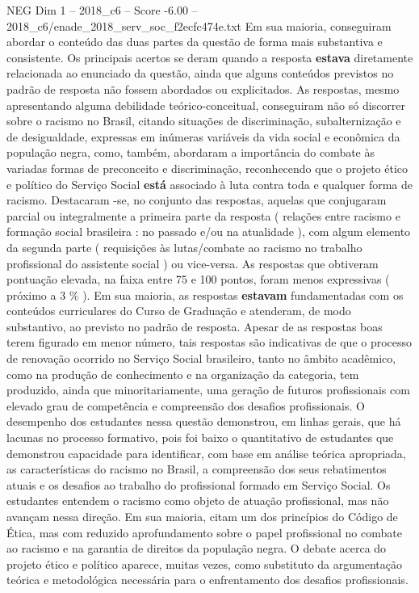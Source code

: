 \begin{textsample}{NEG Dim 1 – 2018\_c6 – Score -6.00 – 2018\_c6/enade\_2018\_serv\_soc\_f2ecfc474e.txt}
Em sua maioria, conseguiram abordar o conteúdo das duas partes da questão de forma mais substantiva e consistente.
Os principais acertos se deram quando a resposta \textbf{estava} diretamente relacionada ao enunciado da questão, ainda que alguns conteúdos previstos no padrão de resposta não fossem abordados ou explicitados.
As respostas, mesmo apresentando alguma debilidade teórico-conceitual, conseguiram não só discorrer sobre o racismo no Brasil, citando situações de discriminação, subalternização e de desigualdade, expressas em inúmeras variáveis da vida social e econômica da população negra, como, também, abordaram a importância do combate às variadas formas de preconceito e discriminação, reconhecendo que o projeto ético e político do Serviço Social \textbf{está} associado à luta contra toda e qualquer forma de racismo.
Destacaram -se, no conjunto das respostas, aquelas que conjugaram parcial ou integralmente a primeira parte da resposta ( relações entre racismo e formação social brasileira : no passado e/ou na atualidade ), com algum elemento da segunda parte ( requisições às lutas/combate ao racismo no trabalho profissional do assistente social ) ou vice-versa.
As respostas que obtiveram pontuação elevada, na faixa entre 75 e 100 pontos, foram menos expressivas ( próximo a 3 \% ).
Em sua maioria, as respostas \textbf{estavam} fundamentadas com os conteúdos curriculares do Curso de Graduação e atenderam, de modo substantivo, ao previsto no padrão de resposta.
Apesar de as respostas boas terem figurado em menor número, tais respostas são indicativas de que o processo de renovação ocorrido no Serviço Social brasileiro, tanto no âmbito acadêmico, como na produção de conhecimento e na organização da categoria, tem produzido, ainda que minoritariamente, uma geração de futuros profissionais com elevado grau de competência e compreensão dos desafios profissionais.
O desempenho dos estudantes nessa questão demonstrou, em linhas gerais, que há lacunas no processo formativo, pois foi baixo o quantitativo de estudantes que demonstrou capacidade para identificar, com base em análise teórica apropriada, as características do racismo no Brasil, a compreensão dos seus rebatimentos atuais e os desafios ao trabalho do profissional formado em Serviço Social.
Os estudantes entendem o racismo como objeto de atuação profissional, mas não avançam nessa direção.
Em sua maioria, citam um dos princípios do Código de Ética, mas com reduzido aprofundamento sobre o papel profissional no combate ao racismo e na garantia de direitos da população negra.
O debate acerca do projeto ético e político aparece, muitas vezes, como substituto da argumentação teórica e metodológica necessária para o enfrentamento dos desafios profissionais.

\end{textsample}

